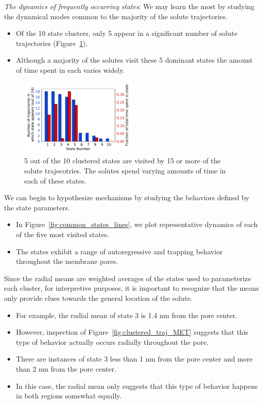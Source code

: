 \documentclass[journal=jpcbfk,manuscript=article]{achemso}
\begin{document}
  \textit{The dynamics of frequently occurring states}: We may learn the most by 
  studying the dynamical modes common to the majority of the solute trajectories.
  \begin{itemize}
  	\item Of the 10 state clusters, only 5 appear in a significant number of 
  	solute trajectories (Figure~\ref{fig:prevalence}).
  	\item Although a majority of the solutes visit these 5 dominant states the
  	amount of time spent in each varies widely. 
  \end{itemize} 
  
  \begin{figure}
  \centering
  \includegraphics[width=0.5\textwidth]{prevalence.pdf}
  \caption{5 out of the 10 clustered states are visited by 15 or more of the solute
  trajecotries. The solutes spend varying amounts of time in each of these states.
  }
  \label{fig:prevalence}
  \end{figure}
  
  We can begin to hypothesize mechanisms by studying the behaviors defined by the 
  state parameters.
  \begin{itemize}
  	\item In Figure~\ref{fig:common_states_lines}, we plot representative 
  	dynamics of each of the five most visited states.
  	\item The states exhibit a range of autoregressive and trapping behavior
  	throughout the membrane pores.
  \end{itemize}
  
  Since the radial means are weighted averages of the states used to parameterize
  each cluster, for interpretive purposes, it is important to recognize that the means
  only provide clues towards the general location of the solute. 
  \begin{itemize}
  	\item For example, the radial mean of state 3 is 1.4 nm from the pore center. 
  	\item However, inspection of Figure~\ref{fig:clustered_traj_MET} suggests that this 
  	type of behavior actually occurs radially throughout the pore.
  	\item There are instances of state 3 less than 1 nm from the pore center and more 
  	than 2 nm from the pore center. 
  	\item In this case, the radial mean only suggests that this type of behavior 
  	happens in both regions somewhat equally.
  \end{itemize}
  
\end{document}
